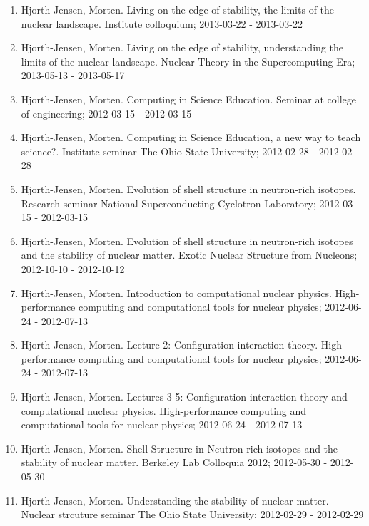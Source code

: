 \documentclass[%
oneside,                 %
final,                   %
10pt]{article}
\begin{document}
\begin{enumerate}
\item Hjorth-Jensen, Morten.  Living on the edge of stability, the limits of the nuclear landscape. Institute colloquium; 2013-03-22 - 2013-03-22

\item Hjorth-Jensen, Morten.  Living on the edge of stability, understanding the limits of the nuclear landscape. Nuclear Theory in the Supercomputing Era; 2013-05-13 - 2013-05-17

\item Hjorth-Jensen, Morten.  Computing in Science Education. Seminar at college of engineering; 2012-03-15 - 2012-03-15

\item Hjorth-Jensen, Morten.  Computing in Science Education, a new way to teach science?. Institute seminar The Ohio State University; 2012-02-28 - 2012-02-28

\item Hjorth-Jensen, Morten.  Evolution of shell structure in neutron-rich isotopes. Research seminar National Superconducting Cyclotron Laboratory; 2012-03-15 - 2012-03-15

\item Hjorth-Jensen, Morten.  Evolution of shell structure in neutron-rich isotopes and the stability of nuclear matter. Exotic Nuclear Structure from Nucleons; 2012-10-10 - 2012-10-12

\item Hjorth-Jensen, Morten.  Introduction to computational nuclear physics. High-performance computing and computational tools for nuclear physics; 2012-06-24 - 2012-07-13

\item Hjorth-Jensen, Morten.  Lecture 2: Configuration interaction theory. High-performance computing and computational tools for nuclear physics; 2012-06-24 - 2012-07-13

\item Hjorth-Jensen, Morten.  Lectures 3-5: Configuration interaction theory and computational nuclear physics. High-performance computing and computational tools for nuclear physics; 2012-06-24 - 2012-07-13

\item Hjorth-Jensen, Morten.  Shell Structure in Neutron-rich isotopes and the stability of nuclear matter. Berkeley Lab Colloquia 2012; 2012-05-30 - 2012-05-30

\item Hjorth-Jensen, Morten.  Understanding the stability of nuclear matter. Nuclear strcuture seminar The Ohio State University; 2012-02-29 - 2012-02-29


\end{enumerate}
\end{document}
